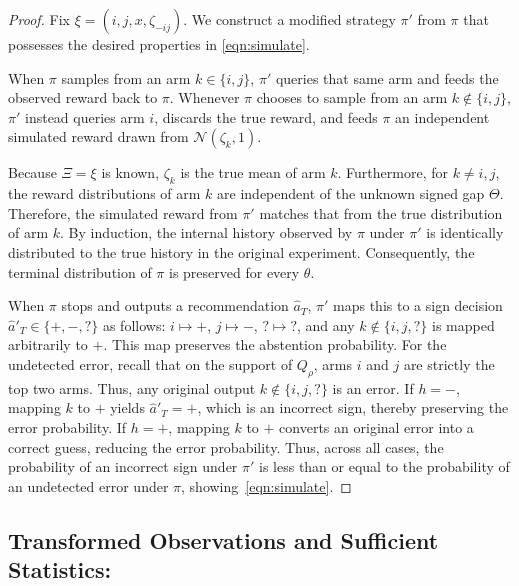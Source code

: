 \documentclass[10pt]{article}
\theoremstyle{plain}
\begin{document}
\begin{proof}
Fix $\xi = (i, j, x, \zeta_{-ij})$. We construct a modified strategy $\pi'$ from $\pi$ that possesses the desired properties in \eqref{eqn:simulate}. 

When $\pi$ samples from an arm $k \in \{i, j\}$, $\pi'$ queries that same arm and feeds the observed reward back to $\pi$. Whenever $\pi$ chooses to sample from an arm $k \notin \{i,j\}$, $\pi'$ instead queries arm $i$, discards the true reward, and feeds $\pi$ an independent simulated reward drawn from $\mathcal{N}(\zeta_k, 1)$.

Because $\Xi = \xi$ is known, $\zeta_k$ is the true mean of arm $k$. Furthermore, for $k\ne i,j$, the reward distributions of arm $k$ are independent of the unknown signed gap $\Theta$. Therefore, the simulated reward from $\pi'$ matches that from the true distribution of arm $k$. By induction, the internal history observed by $\pi$ under $\pi'$ is identically distributed to the true history in the original experiment. Consequently, the terminal distribution of $\pi$ is preserved for every $\theta$.

When $\pi$ stops and outputs a recommendation $\hat{a}_T$, $\pi'$ maps this to a sign decision $\hat{a}'_T \in \{+,-,?\}$ as follows: $i \mapsto +$, $j \mapsto -$, $? \mapsto ?$, and any $k \notin \{i, j, ?\}$ is mapped arbitrarily to $+$. This map preserves the abstention probability. For the undetected error, recall that on the support of $Q_\rho$, arms $i$ and $j$ are strictly the top two arms. Thus, any original output $k \notin \{i, j, ?\}$ is  an error. If $h = -$, mapping $k$ to $+$ yields $\hat{a}'_T = +$, which is an incorrect sign, thereby preserving the error probability. If $h = +$, mapping $k$ to $+$ converts an original error into a correct guess,  reducing the error probability. Thus, across all cases, the probability of an incorrect sign under $\pi'$ is less than or equal to the probability of an undetected error under $\pi$, showing~\eqref{eqn:simulate}.  
\end{proof}






\newcommand{\sgn}{\mathrm{sgn}}

\subsection{Transformed Observations and Sufficient Statistics:}
\label{subsec:local-transformed-observations}
\end{document}
